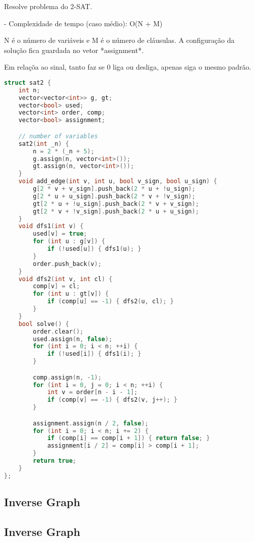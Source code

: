 \documentclass[11pt, a4paper, twoside]{article}
\begin{document}
Resolve problema do 2-SAT.

- Complexidade de tempo (caso médio): O(N + M)  

N é o número de variáveis e M é o número de cláusulas.  
A configuração da solução fica guardada no vetor *assignment*. 

Em relaçõa ao sinal, tanto faz se 0 liga ou desliga, apenas siga o mesmo padrão.

\begin{lstlisting}[language=C++]
struct sat2 {
    int n;
    vector<vector<int>> g, gt;
    vector<bool> used;
    vector<int> order, comp;
    vector<bool> assignment;

    // number of variables
    sat2(int _n) {
        n = 2 * (_n + 5);
        g.assign(n, vector<int>());
        gt.assign(n, vector<int>());
    }
    void add_edge(int v, int u, bool v_sign, bool u_sign) {
        g[2 * v + v_sign].push_back(2 * u + !u_sign);
        g[2 * u + u_sign].push_back(2 * v + !v_sign);
        gt[2 * u + !u_sign].push_back(2 * v + v_sign);
        gt[2 * v + !v_sign].push_back(2 * u + u_sign);
    }
    void dfs1(int v) {
        used[v] = true;
        for (int u : g[v]) {
            if (!used[u]) { dfs1(u); }
        }
        order.push_back(v);
    }
    void dfs2(int v, int cl) {
        comp[v] = cl;
        for (int u : gt[v]) {
            if (comp[u] == -1) { dfs2(u, cl); }
        }
    }
    bool solve() {
        order.clear();
        used.assign(n, false);
        for (int i = 0; i < n; ++i) {
            if (!used[i]) { dfs1(i); }
        }

        comp.assign(n, -1);
        for (int i = 0, j = 0; i < n; ++i) {
            int v = order[n - i - 1];
            if (comp[v] == -1) { dfs2(v, j++); }
        }

        assignment.assign(n / 2, false);
        for (int i = 0; i < n; i += 2) {
            if (comp[i] == comp[i + 1]) { return false; }
            assignment[i / 2] = comp[i] > comp[i + 1];
        }
        return true;
    }
};
\end{lstlisting}

\subsection{Inverse Graph}

\subsection{Inverse Graph}
\end{document}
